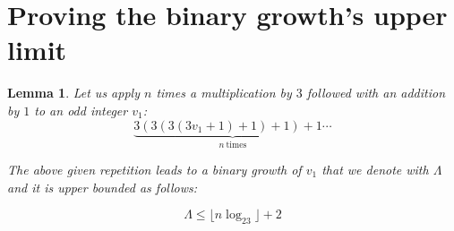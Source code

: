 \documentclass[12pt]{amsart}
\newtheorem{lemma}{Lemma}
\theoremstyle{definition}
\begin{document}
\section{Proving the binary growth's upper limit}
\label{problem_statement}

\begin{lemma}
\label{le:growth_extremal_case}
Let us apply $n$ times a multiplication by $3$ followed with an addition by $1$ to an odd integer $v_1$:
\[
\underbrace{3(3(3(3v_1+1)+1)+1)+1\cdots}_{n~\text{times}}
\]

\par\medskip
The above given repetition leads to a binary growth of $v_1$ that we denote with $\Lambda$ and it is upper bounded as follows:

\[
\Lambda\le\lfloor n\log_23\rfloor+2
\]
\end{lemma}
\end{document}
